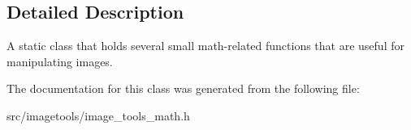 \subsection{Detailed Description}
A static class that holds several small math-\/related functions that are useful for manipulating images. 

The documentation for this class was generated from the following file\+:\begin{DoxyCompactItemize}
\item 
src/imagetools/image\+\_\+tools\+\_\+math.\+h\end{DoxyCompactItemize}
